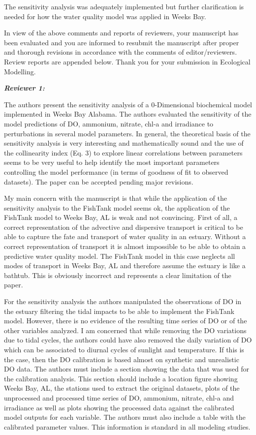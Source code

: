 \documentclass[letterpaper,12pt]{article}\usepackage[]{graphicx}\usepackage[]{color}
\newcommand{\Bigtxt}[1]{\textbf{\textit{#1}}}
\begin{document}
The sensitivity analysis was adequately implemented but further clarification is needed for how the water quality model was applied in Weeks Bay. 

{\it }

In view of the above comments and reports of reviewers, your manuscript has been evaluated and you are informed to resubmit the manuscript after proper and thorough revisions in accordance with the comments of editor/reviewers. Review reports are appended below. Thank you for your submission in Ecological Modelling. 

\Bigtxt{Reviewer 1:}

The authors present the sensitivity analysis of a 0-Dimensional biochemical model implemented in Weeks Bay Alabama. The authors evaluated the sensitivity of the model predictions of DO, ammonium, nitrate, chl-a and irradiance to perturbations in several model parameters. In general, the theoretical basis of the sensitivity analysis is very interesting and mathematically sound and the use of the collinearity index (Eq. 3) to explore linear correlations between parameters seems to be very useful to help identify the most important parameters controlling the model performance (in terms of goodness of fit to observed datasets). The paper can be accepted pending major revisions. 

My main concern with the manuscript is that while the application of the sensitivity analysis to the FishTank model seems ok, the application of the FishTank model to Weeks Bay, AL is weak and not convincing. First of all, a correct representation of the advective and dispersive transport is critical to be able to capture the fate and transport of water quality in an estuary. Without a correct representation of transport it is almost impossible to be able to obtain a predictive water quality model. The FishTank model in this case neglects all modes of transport in Weeks Bay, AL and therefore assume the estuary is like a bathtub. This is obviously incorrect and represents a clear limitation of the paper.

For the sensitivity analysis the authors manipulated the observations of DO in the estuary filtering the tidal impacts to be able to implement the FishTank model. However, there is no evidence of the resulting time series of DO or of the other variables analyzed. I am concerned that while removing the DO variations due to tidal cycles, the authors could have also removed the daily variation of DO which can be associated to diurnal cycles of sunlight and temperature. If this is the case, then the DO calibration is based almost on synthetic and unrealistic DO data. The authors must include a section showing the data that was used for the calibration analysis. This section should include a location figure showing Weeks Bay, AL, the stations used to extract the original datasets, plots of the unprocessed and processed time series of DO, ammonium, nitrate, chl-a and irradiance as well as plots showing the processed data against the calibrated model outputs for each variable. The authors must also include a table with the calibrated parameter values. This information is standard in all modeling studies.
\end{document}
